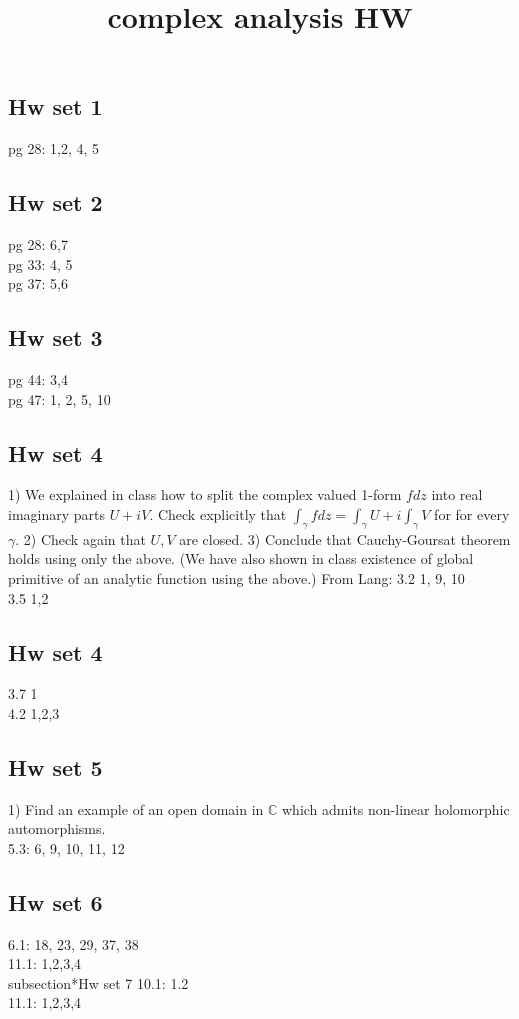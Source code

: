 \documentclass{amsart}
\numberwithin{equation}{section}
\theoremstyle{definition}
\theoremstyle{remark}
\begin{document}
\title{complex analysis HW}
\maketitle
\subsection*{Hw set 1 }
pg 28: 1,2, 4, 5
\subsection*{Hw set 2}
pg 28: 6,7 \\
pg 33: 4, 5 \\
pg 37: 5,6 
\subsection*{Hw set 3}
pg 44: 3,4 \\
pg 47: 1, 2, 5, 10
\subsection*{Hw set 4}
1) We explained in class how to split the complex valued 1-form
$f dz$ into real imaginary parts $U + iV$. Check explicitly
that $\int_{\gamma } f dz = \int_{\gamma} U + i \int_{\gamma
}V$ for for every $\gamma $.
2) Check again that $U,V$ are closed.
3) Conclude that Cauchy-Goursat theorem holds using only the
above. (We have also shown in class existence of global
primitive of an analytic function using the above.)
From Lang:
3.2 1, 9, 10 \\
3.5 1,2 \\
\subsection*{Hw set 4}
3.7 1 \\
4.2 1,2,3 \\
\subsection*{Hw set 5}
1) Find an example of an open domain in $\mathbb{C} $ which
admits non-linear holomorphic automorphisms. \\
5.3: 6, 9, 10, 11, 12 \\
\subsection*{Hw set 6}
6.1: 18, 23, 29, 37, 38 \\
11.1: 1,2,3,4 \\subsection*{Hw set 7}
10.1: 1.2 \\
11.1: 1,2,3,4 \\


\end{document}
